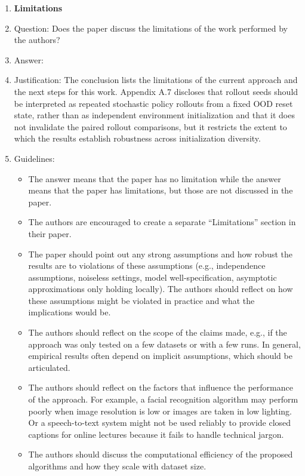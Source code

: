 \documentclass{article}
\begin{document}
\begin{enumerate}
\item {\bf Limitations}
    \item[] Question: Does the paper discuss the limitations of the work performed by the authors?
    \item[] Answer: \answerYes{} %
    \item[] Justification: The conclusion lists the limitations of the current approach and the next steps for this work. Appendix A.7 discloses that rollout seeds should be interpreted as repeated stochastic policy rollouts from a fixed OOD reset state, rather than as independent environment initialization and that it does not invalidate the paired rollout comparisons, but it restricts the extent to which the results establish robustness across initialization diversity.
    \item[] Guidelines:
    \begin{itemize}
        \item The answer \answerNA{} means that the paper has no limitation while the answer \answerNo{} means that the paper has limitations, but those are not discussed in the paper.
        \item The authors are encouraged to create a separate ``Limitations'' section in their paper.
        \item The paper should point out any strong assumptions and how robust the results are to violations of these assumptions (e.g., independence assumptions, noiseless settings, model well-specification, asymptotic approximations only holding locally). The authors should reflect on how these assumptions might be violated in practice and what the implications would be.
        \item The authors should reflect on the scope of the claims made, e.g., if the approach was only tested on a few datasets or with a few runs. In general, empirical results often depend on implicit assumptions, which should be articulated.
        \item The authors should reflect on the factors that influence the performance of the approach. For example, a facial recognition algorithm may perform poorly when image resolution is low or images are taken in low lighting. Or a speech-to-text system might not be used reliably to provide closed captions for online lectures because it fails to handle technical jargon.
        \item The authors should discuss the computational efficiency of the proposed algorithms and how they scale with dataset size.

\end{itemize}
\end{enumerate}
\end{document}
